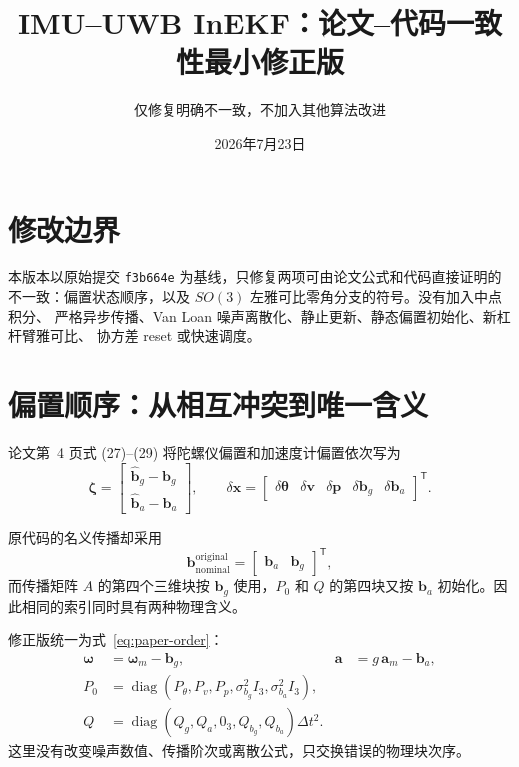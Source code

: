 \documentclass[11pt,a4paper]{ctexart}
\title{IMU--UWB InEKF：论文--代码一致性最小修正版}
\author{仅修复明确不一致，不加入其他算法改进}
\date{2026年7月23日}
\begin{document}
\maketitle

\section{修改边界}

本版本以原始提交 \texttt{f3b664e} 为基线，只修复两项可由论文公式和代码直接证明的
不一致：偏置状态顺序，以及 $SO(3)$ 左雅可比零角分支的符号。没有加入中点积分、
严格异步传播、Van Loan 噪声离散化、静止更新、静态偏置初始化、新杠杆臂雅可比、
协方差 reset 或快速调度。

\section{偏置顺序：从相互冲突到唯一含义}

论文第~4 页式 (27)--(29) 将陀螺仪偏置和加速度计偏置依次写为
\begin{equation}
 \bm\zeta =
 \begin{bmatrix}
 \hat{\bm b}_{g}-\bm b_g\\
 \hat{\bm b}_{a}-\bm b_a
 \end{bmatrix},
 \qquad
 \delta\bm x =
 \begin{bmatrix}
 \delta\bm\theta&
 \delta\bm v&
 \delta\bm p&
 \delta\bm b_g&
 \delta\bm b_a
 \end{bmatrix}^{\mathsf T}.
 \label{eq:paper-order}
\end{equation}

原代码的名义传播却采用
\begin{equation}
 \bm b_{\mathrm{nominal}}^{\mathrm{original}}
 =
 \begin{bmatrix}\bm b_a&\bm b_g\end{bmatrix}^{\mathsf T},
\end{equation}
而传播矩阵 $A$ 的第四个三维块按 $\bm b_g$ 使用，$P_0$ 和 $Q$ 的第四块又按
$\bm b_a$ 初始化。因此相同的索引同时具有两种物理含义。

修正版统一为式~\eqref{eq:paper-order}：
\begin{align}
 \bm\omega &= \bm\omega_m-\bm b_g,
 &
 \bm a &= g\,\bm a_m-\bm b_a,\\
 P_0 &=
 \operatorname{diag}\!\left(
 P_{\theta},P_v,P_p,
 \sigma_{b_g}^2I_3,\sigma_{b_a}^2I_3
 \right),\\
 Q &=
 \operatorname{diag}\!\left(
 Q_g,Q_a,0_3,Q_{b_g},Q_{b_a}
 \right)\Delta t^2.
\end{align}
这里没有改变噪声数值、传播阶次或离散公式，只交换错误的物理块次序。
\end{document}
